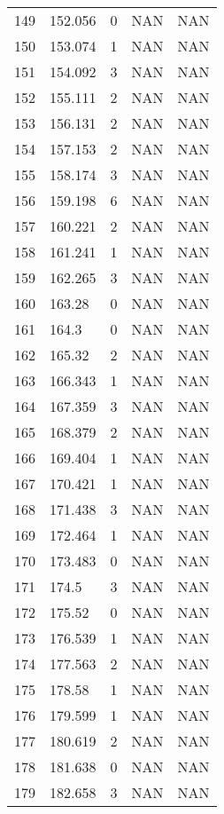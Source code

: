 \documentclass{article}
\begin{document}
\begin{longtable}{@{}lllll@{}}
				149 & 152.056 & 0     & NAN   & NAN   \\
				150 & 153.074 & 1     & NAN   & NAN   \\
				151 & 154.092 & 3     & NAN   & NAN   \\
				152 & 155.111 & 2     & NAN   & NAN   \\
				153 & 156.131 & 2     & NAN   & NAN   \\
				154 & 157.153 & 2     & NAN   & NAN   \\
				155 & 158.174 & 3     & NAN   & NAN   \\
				156 & 159.198 & 6     & NAN   & NAN   \\
				157 & 160.221 & 2     & NAN   & NAN   \\
				158 & 161.241 & 1     & NAN   & NAN   \\
				159 & 162.265 & 3     & NAN   & NAN   \\
				160 & 163.28  & 0     & NAN   & NAN   \\
				161 & 164.3   & 0     & NAN   & NAN   \\
				162 & 165.32  & 2     & NAN   & NAN   \\
				163 & 166.343 & 1     & NAN   & NAN   \\
				164 & 167.359 & 3     & NAN   & NAN   \\
				165 & 168.379 & 2     & NAN   & NAN   \\
				166 & 169.404 & 1     & NAN   & NAN   \\
				167 & 170.421 & 1     & NAN   & NAN   \\
				168 & 171.438 & 3     & NAN   & NAN   \\
				169 & 172.464 & 1     & NAN   & NAN   \\
				170 & 173.483 & 0     & NAN   & NAN   \\
				171 & 174.5   & 3     & NAN   & NAN   \\
				172 & 175.52  & 0     & NAN   & NAN   \\
				173 & 176.539 & 1     & NAN   & NAN   \\
				174 & 177.563 & 2     & NAN   & NAN   \\
				175 & 178.58  & 1     & NAN   & NAN   \\
				176 & 179.599 & 1     & NAN   & NAN   \\
				177 & 180.619 & 2     & NAN   & NAN   \\
				178 & 181.638 & 0     & NAN   & NAN   \\
				179 & 182.658 & 3     & NAN   & NAN   \\

\end{longtable}
\end{document}
